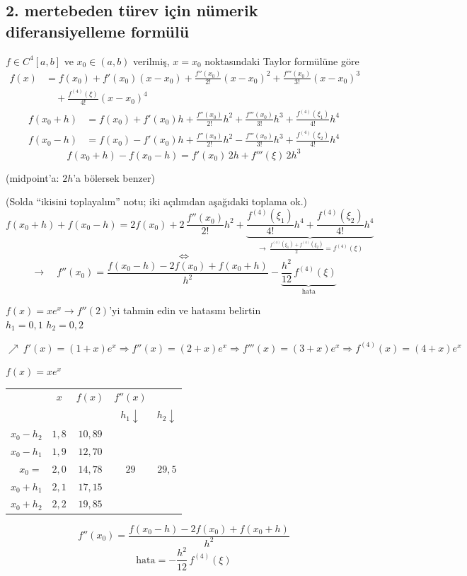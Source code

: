 \documentclass[11pt,a4paper]{article}
\begin{document}
\subsection{2. mertebeden türev için nümerik diferansiyelleme formülü}
$f \in C^4[a,b]$ ve $x_0 \in (a,b)$ verilmiş, $x = x_0$ noktasındaki Taylor formülüne göre
\begin{align*}
  f(x) &= f(x_0) + f'(x_0)(x-x_0) + \frac{f''(x_0)}{2!}(x-x_0)^2 + \frac{f'''(x_0)}{3!}(x-x_0)^3\\
       &\quad + \frac{f^{(4)}(\xi)}{4!}(x-x_0)^4
\end{align*}
\begin{align*}
  f(x_0+h) &= f(x_0) + f'(x_0)h + \frac{f''(x_0)}{2!}h^2 + \frac{f'''(x_0)}{3!}h^3
              + \frac{f^{(4)}(\xi_1)}{4!}h^4\\
  f(x_0-h) &= f(x_0) - f'(x_0)h + \frac{f''(x_0)}{2!}h^2 - \frac{f'''(x_0)}{3!}h^3
              + \frac{f^{(4)}(\xi_2)}{4!}h^4
\end{align*}
\[
  f(x_0+h) - f(x_0-h) = f'(x_0)\,2h + f'''(\xi)\,2h^3
\]
\begin{center}
(midpoint'a: $2h$'a bölersek benzer)
\end{center}
{\small(Solda ``ikisini toplayalım'' notu; iki açılımdan aşağıdaki toplama ok.)}
\[
  f(x_0+h) + f(x_0-h) = 2f(x_0) + 2\,\frac{f''(x_0)}{2!}h^2
  + \underbrace{\frac{f^{(4)}(\xi_1)}{4!}h^4 + \frac{f^{(4)}(\xi_2)}{4!}h^4}_{\displaystyle\rightarrow\ \frac{f^{(4)}(\xi_1) + f^{(4)}(\xi_2)}{2} = f^{(4)}(\xi)}
\]
\[
  \Leftrightarrow
\]
\[
  \rightarrow\quad f''(x_0) = \frac{f(x_0-h) - 2f(x_0) + f(x_0+h)}{h^2}
  - \underbrace{\frac{h^2}{12}\,f^{(4)}(\xi)}_{\text{hata}}
\]

\begin{ornek}[4]
$f(x) = xe^x \rightarrow f''(2)$'yi tahmin edin ve hatasını belirtin\\
$h_1 = 0{,}1$ \qquad $h_2 = 0{,}2$
\end{ornek}
\[
  \nearrow\ f'(x) = (1+x)e^x \Rightarrow f''(x) = (2+x)e^x \Rightarrow f'''(x) = (3+x)e^x
  \Rightarrow f^{(4)}(x) = (4+x)e^x
\]
\noindent
\begin{minipage}[c]{0.52\linewidth}
\centering
$f(x) = xe^x$\\[1mm]
\begin{tabular}{r c|c|c|c}
 & $x$ & $f(x)$ & $f''(x)$ & \\
 & & & $h_1\downarrow$ & $h_2\downarrow$\\ \hline
$x_0 - h_2$ & $1{,}8$ & $10{,}89$ & & \\
$x_0 - h_1$ & $1{,}9$ & $12{,}70$ & & \\ \hline
$x_0 =$ & $2{,}0$ & $14{,}78$ & $29$ & $29{,}5$\\ \hline
$x_0 + h_1$ & $2{,}1$ & $17{,}15$ & & \\
$x_0 + h_2$ & $2{,}2$ & $19{,}85$ & &
\end{tabular}
\end{minipage}\hfill
\begin{minipage}[c]{0.45\linewidth}
\[
  f''(x_0) = \frac{f(x_0-h) - 2f(x_0) + f(x_0+h)}{h^2}
\]
\[
  \text{hata} = -\frac{h^2}{12}\,f^{(4)}(\xi)
\]
\end{minipage}
\end{document}
